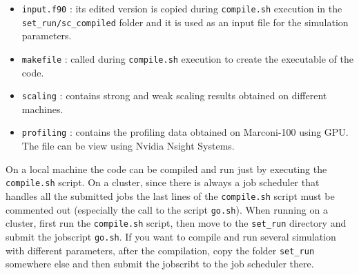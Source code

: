 \begin{itemize}
\item \texttt{input.f90} : its edited version is copied during \texttt{compile.sh} execution in the \texttt{set\_run/sc\_compiled} folder and it is used as an input file for the simulation parameters.
\item \texttt{makefile} : called during \texttt{compile.sh} execution to create the executable of the code.
\item \texttt{scaling} : contains strong and weak scaling results obtained on different machines.
\item \texttt{profiling} : contains the profiling data obtained on Marconi-100 using GPU. The file can be view using Nvidia Nsight Systems.
\end{itemize}
On a local machine the code can be compiled and run just by executing the \texttt{compile.sh} script. On a cluster, since there is always a job scheduler that handles all the submitted jobs the last lines of the \texttt{compile.sh} script must be commented out (especially the call to the script \texttt{go.sh}). When running on a cluster, first run the \texttt{compile.sh} script, then move to the \texttt{set\_run} directory and submit the jobscript \texttt{go.sh}. If you want to compile and run several simulation with different parameters, after the compilation, copy the folder \texttt{set\_run} somewhere else and then submit the jobscribt to the job scheduler there.\\


